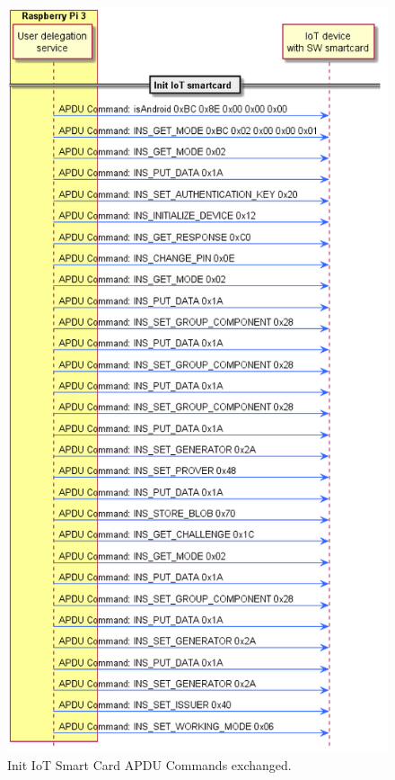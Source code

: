 \begin{figure}[bth]
	\begin{center}
		\includegraphics[width=0.9\linewidth]{gfx/UML/APDUsInitIoTSC}
	\end{center}
	\caption{Init IoT Smart Card APDU Commands exchanged.}
	\label{fig:APDUsInitIoTSC}
\end{figure}

